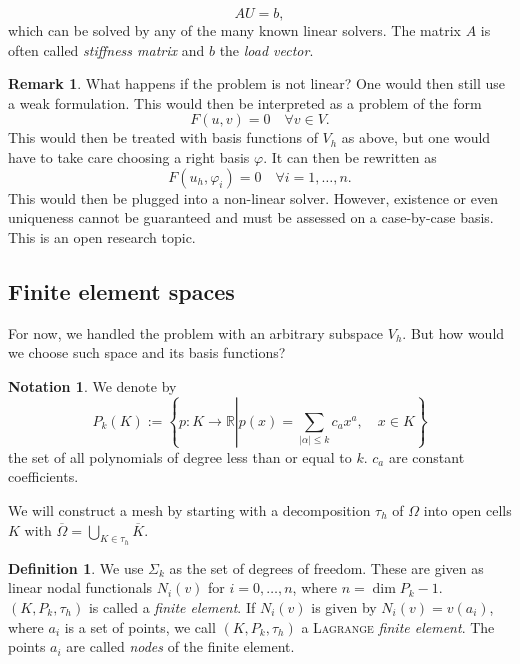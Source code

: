 \documentclass[12pt,a4paper,twoside, open=right]{scrreprt}
\theoremstyle{definition}
\newtheorem{rem}[auf]{Remark}
\newtheorem{defn}[auf]{Definition}
\newtheorem{notation}[auf]{Notation}
\theoremstyle{plain}
\newcommand{\abs}[1]{\left\vert #1\right\vert}
\newcommand{\rr}{\mathbb{R}}
\begin{document}
\begin{equation}
    AU=b,
\end{equation} which can be solved by any of the many known linear solvers. The matrix $A$ is often called \emph{stiffness matrix} and $b$ the \emph{load vector}.
\begin{rem}
    What happens if the problem is not linear? One would then still use a weak formulation. This would then be interpreted as a problem of the form
    \begin{equation}
        F(u,v) = 0 \quad\forall v \in V.
    \end{equation}
    This would then be treated with basis functions of $V_h$ as above, but one would have to take care choosing a right basis $\varphi$. It can then be rewritten as 
    \begin{equation}
        F(u_h, \varphi_i) = 0 \quad \forall i=1,\dotsc,n.
    \end{equation}
    This would then be plugged into a non-linear solver. However, existence or even uniqueness cannot be guaranteed and must be assessed on a case-by-case basis. This is an open research topic.
\end{rem}
\subsection{Finite element spaces}
For now, we handled the problem with an arbitrary subspace $V_h$. But how would we choose such space and its basis functions?
\begin{notation}
    We denote by
    \begin{equation}
        P_k(K):=\left\{p\colon K\to\rr\left\vert p(x)=\sum_{\abs{\alpha}\le k}c_ax^a,\right.\quad x\in K\right\}
    \end{equation}
    the set of all polynomials of degree less than or equal to $k$. $c_a$ are constant coefficients.
\end{notation}
We will construct a mesh by starting with a decomposition $\tau_h$ of $\Omega$ into open cells $K$ with $\overline{\Omega}=\bigcup_{K\in\tau_h}\overline{K}$.
\begin{defn}
    We use $\Sigma_k$ as the set of degrees of freedom. These are given as linear nodal functionals $N_i(v)$ for $i=0,\dotsc,n$, where $n= \dim P_k -1$. $(K,P_k,\tau_h)$ is called a \emph{finite element}. If $N_i(v)$ is given by $N_i(v)=v(a_i)$, where $a_i$ is a set of points, we call $(K,P_k,\tau_h)$ a \textsc{Lagrange} \emph{finite element}. The points $a_i$ are called \emph{nodes} of the finite element.
\end{defn}
\end{document}

